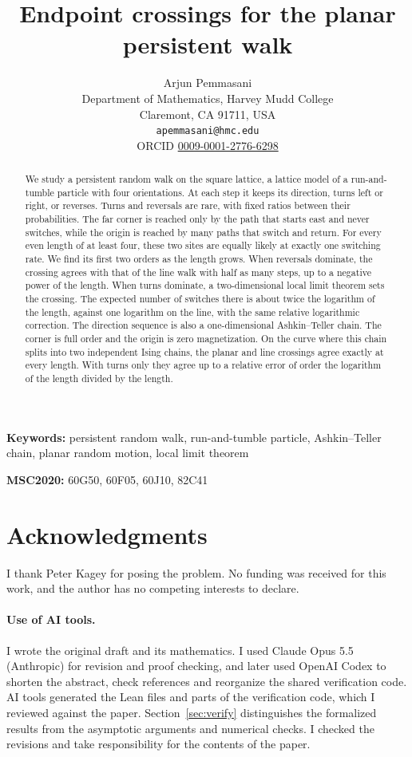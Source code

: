 \documentclass[11pt]{article}
\title{Endpoint crossings for the planar persistent walk}
\author{Arjun Pemmasani\\[2pt]
 \small Department of Mathematics, Harvey Mudd College\\
 \small Claremont, CA 91711, USA\\
 \small \texttt{apemmasani@hmc.edu}\\
 \small ORCID \href{https://orcid.org/0009-0001-2776-6298}{0009-0001-2776-6298}}
\date{}
\theoremstyle{definition}
\theoremstyle{remark}
\begin{document}
\maketitle

\begin{abstract}
We study a persistent random walk on the square lattice, a lattice model of a
run-and-tumble particle with four orientations. At each step it keeps its
direction, turns left or right, or reverses. Turns and reversals are rare,
with fixed ratios between their probabilities. The far corner is reached
only by the path that starts east and never switches, while the origin is
reached by many paths that switch and return. For every even length of at
least four, these two sites are equally likely at exactly one switching
rate. We find its first two orders as the length grows. When reversals
dominate, the crossing agrees with that of the line walk with half as many
steps, up to a negative power of the length. When turns dominate, a
two-dimensional local limit theorem sets the crossing. The expected number
of switches there is about twice the logarithm of the length, against one
logarithm on the line, with the same relative logarithmic correction.
The direction sequence is also a one-dimensional Ashkin--Teller chain.
The corner is full order and the origin is zero magnetization. On the curve
where this chain splits into two independent Ising chains, the planar and
line crossings agree exactly at every length. With turns only they agree
up to a relative error of order the logarithm of the length divided by the
length.
\end{abstract}

\medskip
\noindent\textbf{Keywords:} persistent random walk, run-and-tumble particle,
Ashkin--Teller chain, planar random motion, local limit theorem

\noindent\textbf{MSC2020:} 60G50, 60F05, 60J10, 82C41







\section*{Acknowledgments}
I thank Peter Kagey for posing the problem. No funding was received for this
work, and the author has no competing interests to declare.

\paragraph{Use of AI tools.}
I wrote the original draft and its mathematics. I used Claude Opus 5.5
(Anthropic) for revision and proof checking, and later used OpenAI Codex to
shorten the abstract, check references and reorganize the shared verification
code. AI tools generated the Lean files and parts of the verification code,
which I reviewed against the paper. Section~\ref{sec:verify} distinguishes
the formalized results from the asymptotic arguments and numerical checks.
I checked the revisions and take responsibility for the contents of the paper.
\end{document}
